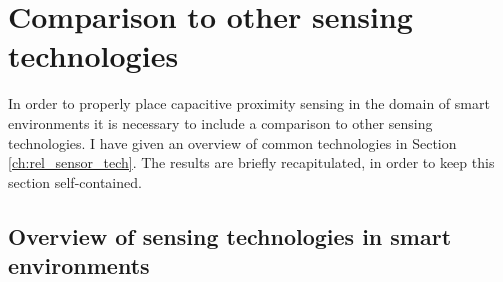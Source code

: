 \section{Comparison to other sensing technologies}
In order to properly place capacitive proximity sensing in the domain of smart environments it is necessary to include a comparison to other sensing technologies. I have given an overview of common technologies in Section \ref{ch:rel_sensor_tech}. The results are briefly recapitulated, in order to keep this section self-contained. 

\subsection{Overview of sensing technologies in smart environments}
